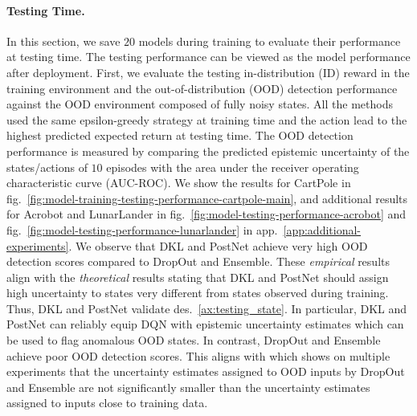 
\paragraph{Testing Time.} In this section, we save $20$ models during training to evaluate their performance at testing time. The testing performance can be viewed as the model performance after deployment. First, we evaluate the testing in-distribution (ID) reward in the training environment and the out-of-distribution (OOD) detection performance against the OOD environment composed of fully noisy states. All the methods used the same epsilon-greedy strategy at training time and the action lead to the highest predicted expected return at testing time. The OOD detection performance is measured by comparing the predicted epistemic uncertainty of the states/actions of $10$ episodes with the area under the receiver operating characteristic curve (AUC-ROC). We show the results for CartPole in fig.~\ref{fig:model-training-testing-performance-cartpole-main}, and additional results for Acrobot and LunarLander in fig.~\ref{fig:model-testing-performance-acrobot} and fig.~\ref{fig:model-testing-performance-lunarlander} in app.~\ref{app:additional-experiments}. We observe that DKL and PostNet achieve very high OOD detection scores compared to DropOut and Ensemble. These \emph{empirical} results align with the \emph{theoretical} results stating that DKL and PostNet should assign high uncertainty to states very different from states observed during training. Thus, DKL and PostNet validate des.~\ref{ax:testing_state}. In particular, DKL and PostNet can reliably equip DQN with epistemic uncertainty estimates which can be used to flag anomalous OOD states. In contrast, DropOut and Ensemble achieve poor OOD detection scores. This aligns with \cite{randomized-prior-functions, natpn} which shows on multiple experiments that the uncertainty estimates assigned to OOD inputs by DropOut and Ensemble are not significantly smaller than the uncertainty estimates assigned to inputs close to training data.

%
%
%

